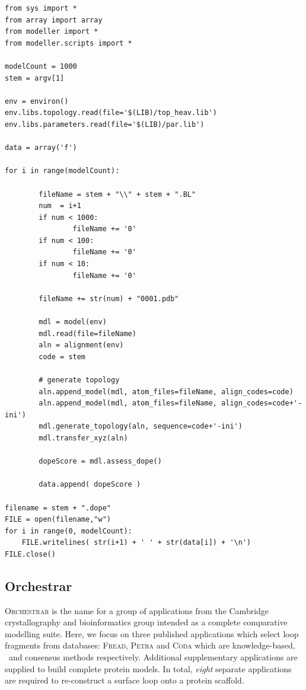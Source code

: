 \begin{lstlisting}[float, caption={The \modloop\ Python script used to generate \textsc{Dope} scores.}, label=listing:methcomp:modloop_dope]
from sys import *
from array import array
from modeller import *
from modeller.scripts import *
        
modelCount = 1000
stem = argv[1]

env = environ()
env.libs.topology.read(file='$(LIB)/top_heav.lib')
env.libs.parameters.read(file='$(LIB)/par.lib')

data = array('f')

for i in range(modelCount):

        fileName = stem + "\\" + stem + ".BL"   
        num  = i+1 
        if num < 1000:
                fileName += '0'
        if num < 100:
                fileName += '0'
        if num < 10:
                fileName += '0'    

        fileName += str(num) + "0001.pdb"
                
        mdl = model(env)
        mdl.read(file=fileName)
        aln = alignment(env)
        code = stem
        
        # generate topology
        aln.append_model(mdl, atom_files=fileName, align_codes=code)
        aln.append_model(mdl, atom_files=fileName, align_codes=code+'-ini')
        mdl.generate_topology(aln, sequence=code+'-ini')
        mdl.transfer_xyz(aln)
        
        dopeScore = mdl.assess_dope()

        data.append( dopeScore )
            
filename = stem + ".dope"       
FILE = open(filename,"w")     
for i in range(0, modelCount):
    FILE.writelines( str(i+1) + ' ' + str(data[i]) + '\n')
FILE.close()
\end{lstlisting}







\subsection{Orchestrar}
\label{section:methcomp:orchestrar}


\textsc{Orchestrar} is the name for a group of applications from the Cambridge crystallography and bioinformatics 
 group intended as a complete comparative modelling suite. Here, we focus on three published applications which select
loop fragments from databases: \textsc{Fread}\cite{METHOD:CODA}, \textsc{Petra}\cite{METHOD:Petra} and \textsc{Coda}\cite{METHOD:CODA} which are knowledge-based, \abinitio\ and consensus methods respectively. Additional supplementary applications are supplied to build complete protein models.
In total, \emph{eight} separate applications are required to re-construct a surface
loop onto a protein scaffold.


